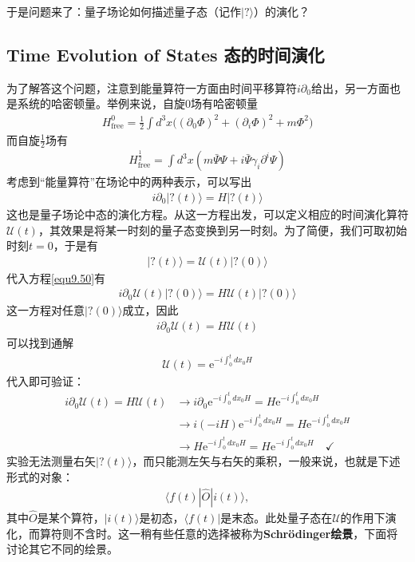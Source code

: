 于是问题来了：量子场论如何描述量子态（记作$|?\rangle$）的演化？

\subsection[态的时间演化]{Time Evolution of States \quad 态的时间演化}\label{sec9.5.2}
为了解答这个问题，注意到能量算符一方面由时间平移算符$i\partial_0$给出，另一方面也是系统的哈密顿量。举例来说，自旋$0$场有哈密顿量
\begin{align}\label{equ9.48}
H_\text{free}^0=\frac{1}{2}\int d^3x \Big( (\partial_0\Phi)^2+(\partial_i\Phi)^2+m\Phi^2 \Big)
\end{align}
而自旋$\frac{1}{2}$场有
\begin{align}\label{equ9.49}
H_\text{free}^{\frac{1}{2}}=\int d^3x(m\bar{\Psi}\Psi+i\bar{\Psi}\gamma_i\partial^i\Psi)
\end{align}
考虑到“能量算符”在场论中的两种表示，可以写出
\begin{align}\label{equ9.50}
i\partial_0|?(t)\rangle=H|?(t)\rangle
\end{align}
这也是量子场论中态的演化方程。从这一方程出发，可以定义相应的时间演化算符$\mathcal{U}(t)$，其效果是将某一时刻的量子态变换到另一时刻。为了简便，我们可取初始时刻$t=0$，于是有
\begin{align}\label{equ9.51}
|?(t)\rangle=\mathcal{U}(t)|?(0)\rangle
\end{align}
代入方程\eqref{equ9.50}有
\begin{align}\label{equ9.52}
i\partial_0\mathcal{U}(t)|?(0)\rangle=H\mathcal{U}(t)|?(0)\rangle
\end{align}
这一方程对任意$|?(0)\rangle$成立，因此
\begin{align}\label{equ9.53}
i\partial_0\mathcal{U}(t)=H\mathcal{U}(t)
\end{align}
可以找到通解
\begin{align}\label{equ9.54}
\mathcal{U}(t)=\text{e}^{-i\int_0^tdx_0H}
\end{align}
代入即可验证：
\begin{align}
i\partial_0\mathcal{U}(t) = H \mathcal{U}(t) &\to i\partial_0\mathrm{e}^{-i\int_0^tdx_0H}=H\mathrm{e}^{-i\int_0^t dx_0H}\nonumber\\
&\to i(-iH)\text{e}^{-i\int_0^tdx_0H}=H\mathrm{e}^{-i\int_0^tdx_0H}\nonumber\\
&\to H\text{e}^{-i\int_0^tdx_0H}=H\mathrm{e}^{-i\int_0^tdx_0H}\quad\checkmark \label{equ9.55}
\end{align}
实验无法测量右矢$|?(t)\rangle$，而只能测左矢与右矢的乘积，一般来说，也就是下述形式的对象：
\begin{align}\label{equ9.56}
\langle f(t)|\hat{O}|i(t)\rangle,
\end{align}
其中$\hat{O}$是某个算符，$|i(t)\rangle$是初态，$\langle f(t)|$是末态。此处量子态在$\mathcal{U}$的作用下演化，而算符则不含时。这一稍有些任意的选择被称为\textbf{Schr\"{o}dinger绘景}，下面将讨论其它不同的绘景。


